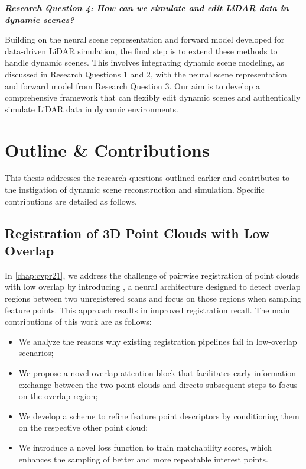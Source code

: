 \noindent
\textbf{\textit{Research Question 4: How can we simulate and edit LiDAR data in dynamic scenes?}}

Building on the neural scene representation and forward model developed for data-driven LiDAR simulation, the final step is to extend these methods to handle dynamic scenes. This involves integrating dynamic scene modeling, as discussed in Research Questions 1 and 2, with the neural scene representation and forward model from Research Question 3. Our aim is to develop a comprehensive framework that can flexibly edit dynamic scenes and authentically simulate LiDAR data in dynamic environments.

\section{Outline \& Contributions} 
This thesis addresses the research questions outlined earlier and contributes to the instigation of dynamic scene reconstruction and simulation. Speciﬁc contributions are detailed as follows.


\subsection{Registration of 3D Point Clouds with Low Overlap}
In \cref{chap:cvpr21}, we address the challenge of pairwise registration of point clouds with low overlap by introducing \acro, a neural architecture designed to detect overlap regions between two unregistered scans and focus on those regions when sampling feature points. This approach results in improved registration recall. The main contributions of this work are as follows:

\begin{itemize}
\item We analyze the reasons why existing registration pipelines fail in low-overlap scenarios;
\item We propose a novel overlap attention block that facilitates early information exchange between the two point clouds and directs subsequent steps to focus on the overlap region;
\item We develop a scheme to refine feature point descriptors by conditioning them on the respective other point cloud;
\item We introduce a novel loss function to train matchability scores, which enhances the sampling of better and more repeatable interest points.
\end{itemize}

